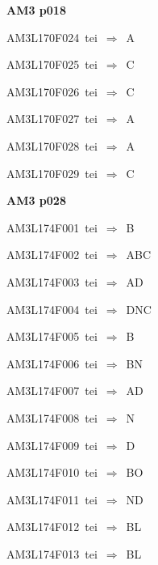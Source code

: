 \par\vfill\eject
{\bf\hfill AM3 p018\hfill\hbox{}}\par\bigskip
{\sixrm AM3L170F024\ {\sixit tei}\ }$\Rightarrow$\ A\par\smallskip
{\sixrm AM3L170F025\ {\sixit tei}\ }$\Rightarrow$\ C\par\smallskip
{\sixrm AM3L170F026\ {\sixit tei}\ }$\Rightarrow$\ C\par\smallskip
{\sixrm AM3L170F027\ {\sixit tei}\ }$\Rightarrow$\ A\par\smallskip
{\sixrm AM3L170F028\ {\sixit tei}\ }$\Rightarrow$\ A\par\smallskip
{\sixrm AM3L170F029\ {\sixit tei}\ }$\Rightarrow$\ C\par\smallskip

\par\vfill\eject
{\bf\hfill AM3 p028\hfill\hbox{}}\par\bigskip
{\sixrm AM3L174F001\ {\sixit tei}\ }$\Rightarrow$\ B\par\smallskip
{\sixrm AM3L174F002\ {\sixit tei}\ }$\Rightarrow$\ ABC\par\smallskip
{\sixrm AM3L174F003\ {\sixit tei}\ }$\Rightarrow$\ AD\par\smallskip
{\sixrm AM3L174F004\ {\sixit tei}\ }$\Rightarrow$\ DNC\par\smallskip
{\sixrm AM3L174F005\ {\sixit tei}\ }$\Rightarrow$\ B\par\smallskip
{\sixrm AM3L174F006\ {\sixit tei}\ }$\Rightarrow$\ BN\par\smallskip
{\sixrm AM3L174F007\ {\sixit tei}\ }$\Rightarrow$\ AD\par\smallskip
{\sixrm AM3L174F008\ {\sixit tei}\ }$\Rightarrow$\ N\par\smallskip
{\sixrm AM3L174F009\ {\sixit tei}\ }$\Rightarrow$\ D\par\smallskip
{\sixrm AM3L174F010\ {\sixit tei}\ }$\Rightarrow$\ BO\par\smallskip
{\sixrm AM3L174F011\ {\sixit tei}\ }$\Rightarrow$\ ND\par\smallskip
{\sixrm AM3L174F012\ {\sixit tei}\ }$\Rightarrow$\ BL\par\smallskip
{\sixrm AM3L174F013\ {\sixit tei}\ }$\Rightarrow$\ BL\par\smallskip

